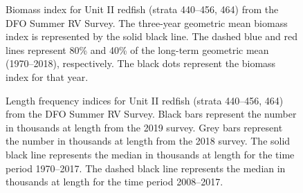 \documentclass[11pt]{book}
\begin{document}
\begin{figure}[htb]

{\centering {} 

}

\caption{Biomass index for Unit II redfish (strata 440--456, 464) from the DFO Summer RV Survey. The three-year geometric mean biomass index is represented by the solid black line. The dashed blue and red lines represent 80\% and 40\% of the long-term geometric mean (1970--2018), respectively. The black dots represent the biomass index for that year.}\label{fig:37-fig-redfish-biomassUnitII}
\end{figure}

\begin{figure}[htb]

{\centering {} 

}

\caption{Length frequency indices for Unit II redfish (strata 440--456, 464) from the DFO Summer RV Survey. Black bars represent the number in thousands at length from the 2019 survey. Grey bars represent the number in thousands at length from the 2018 survey. The solid black line represents the median in thousands at length for the time period 1970--2017. The dashed black line represents the median in thousands at length for the time period 2008--2017.}\label{fig:38-fig-redfish-lengthfreqUnitII}
\end{figure}
\end{document}
